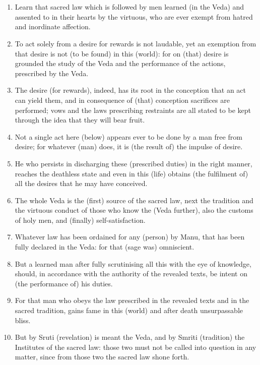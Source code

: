 \chapter{}
\begin{enumerate}
\item Learn that sacred law which is followed by men learned (in the Veda) and assented to in their hearts by the virtuous, who are ever exempt from hatred and inordinate affection.
\item To act solely from a desire for rewards is not laudable, yet an exemption from that desire is not (to be found) in this (world): for on (that) desire is grounded the study of the Veda and the performance of the actions, prescribed by the Veda.
\item The desire (for rewards), indeed, has its root in the conception that an act can yield them, and in consequence of (that) conception sacrifices are performed; vows and the laws prescribing restraints are all stated to be kept through the idea that they will bear fruit.
\item Not a single act here (below) appears ever to be done by a man free from desire; for whatever (man) does, it is (the result of) the impulse of desire.
\item He who persists in discharging these (prescribed duties) in the right manner, reaches the deathless state and even in this (life) obtains (the fulfilment of) all the desires that he may have conceived.
\item The whole Veda is the (first) source of the sacred law, next the tradition and the virtuous conduct of those who know the (Veda further), also the customs of holy men, and (finally) self-satisfaction.
\item Whatever law has been ordained for any (person) by Manu, that has been fully declared in the Veda: for that (sage was) omniscient.
\item But a learned man after fully scrutinising all this with the eye of knowledge, should, in accordance with the authority of the revealed texts, be intent on (the performance of) his duties.
\item For that man who obeys the law prescribed in the revealed texts and in the sacred tradition, gains fame in this (world) and after death unsurpassable bliss.
\item But by Sruti (revelation) is meant the Veda, and by Smriti (tradition) the Institutes of the sacred law: those two must not be called into question in any matter, since from those two the sacred law shone forth.

\end{enumerate}

